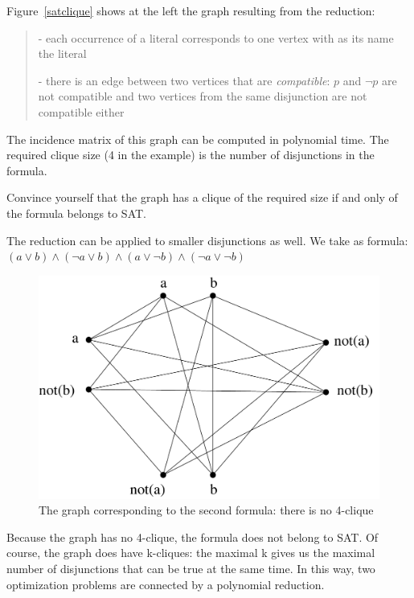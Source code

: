 \begin{vb}
Figure~\ref{satclique} shows at the left the graph resulting from the
reduction:
\begin{verse}
- each occurrence of a literal corresponds to one vertex with as its
name the literal

- there is an edge between two vertices that are {\em compatible}: $p$
and $\neg p$ are not compatible and two vertices from the same
disjunction are not compatible either
\end{verse}

The incidence matrix of this graph can be computed in polynomial
time. The required clique size (4 in the example) is the number of
disjunctions in the formula.
\end{vb}

Convince yourself that the graph has a clique of the required size if
and only of the formula belongs to SAT.


\begin{vb}
The reduction can be applied to smaller disjunctions as well. We take
as formula: $(a \vee b) \wedge (\neg a \vee b) \wedge (a \vee \neg b)
\wedge (\neg a \vee \neg b)$


\begin{figure}[h]
\begin{center}
\includegraphics[height=0.2\textheight,keepaspectratio]{satclique2}
\caption{The graph corresponding to the second formula: there is no
4-clique}\label{satclique2}
\end{center}
\end{figure}

Because the graph has no 4-clique, the formula does not belong to
SAT. Of course, the graph does have k-cliques: the maximal k gives us
the maximal number of disjunctions that can be true at the same
time. In this way, two optimization problems are connected by a
polynomial reduction.

\end{vb}

